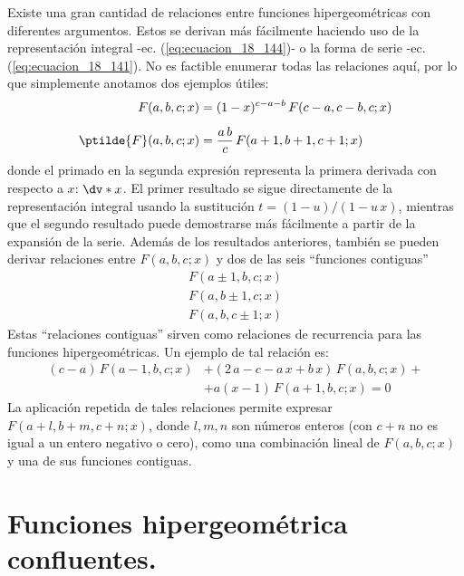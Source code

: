 Existe una gran cantidad de relaciones entre funciones hipergeométricas con diferentes argumentos. Estos se derivan más fácilmente haciendo uso de la representación integral -ec. (\ref{eq:ecuacion_18_144})- o la forma de serie -ec. (\ref{eq:ecuacion_18_141}). No es factible enumerar todas las relaciones aquí, por lo que simplemente anotamos dos ejemplos útiles:
\begin{align}
F(a, b, c; x) &= (1 - x)^{c-a-b} \, F(c - a, c - b, c; x) \label{eq:ecuacion_18_145} \\[0.5em]
\ptilde{F} (a, b, c; x) &= \dfrac{a \, b}{c} \, F(a + 1, b + 1, c + 1; x) \label{eq:ecuacion_18_146}
\end{align}
donde el primado en la segunda expresión representa la primera derivada con respecto a $x$: $\dv*{x}$. El primer resultado se sigue directamente de la representación integral usando la sustitución $t = (1 - u) / (1 - u \, x)$, mientras que el segundo resultado puede demostrarse más fácilmente a partir de la expansión de la serie. Además de los resultados anteriores, también se pueden derivar relaciones entre $F (a, b, c; x)$ y dos de las seis \enquote{funciones contiguas} 
\begin{align*}
F (a \pm 1, b, c; x) \\
F (a, b \pm 1, c; x) \\
F (a, b, c \pm 1; x)
\end{align*}
Estas \enquote{relaciones contiguas} sirven como relaciones de recurrencia para las funciones hipergeométricas. Un ejemplo de tal relación es:
\begin{align*}
(c - a) \, F(a - 1, b, c; x) &+ (2 \, a - c - a \, x +  b \, x) \, F(a, b, c; x) + \\[0.5em]
&+ a (x - 1) \, F(a + 1, b, c; x) = 0
\end{align*}
La aplicación repetida de tales relaciones permite expresar $F (a + l, b + m, c + n; x)$, donde $l, m, n$ son números enteros (con $c + n$ no es igual a un entero negativo o cero), como una combinación lineal de $F(a, b, c; x)$ y una de sus funciones contiguas.

\section{Funciones hipergeométrica confluentes.}


